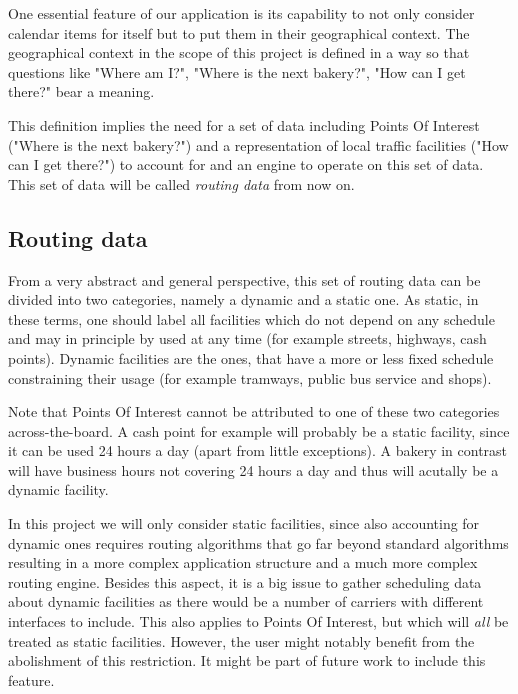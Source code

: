 One essential feature of our application is its capability to not only consider calendar items for itself but to put them in their geographical context. The geographical context in the scope of this project is defined in a way so that questions like "Where am I?", "Where is the next bakery?", "How can I get there?" bear a meaning.\newline

This definition implies the need for a set of data including Points Of Interest ("Where is the next bakery?") and a representation of  local traffic facilities ("How can I get there?") to account for and an engine to operate on this set of data. This set of data will be called \emph{routing data} from now on.

\subsection{Routing data}

From a very abstract and general perspective, this set of routing data can be divided into two categories, namely a dynamic and a static one. As static, in these terms, one should label all facilities which do not depend on any schedule and may in principle by used at any time (for example streets, highways, cash points). Dynamic facilities are the ones, that have a more or less fixed schedule constraining their usage (for example tramways, public bus service and shops).\newline

Note that Points Of Interest cannot be attributed to one of these two categories across-the-board. A cash point for example will probably be a static facility, since it can be used 24 hours a day (apart from little exceptions). A bakery in contrast will have business hours not covering 24 hours a day and thus will acutally be a dynamic facility.\newline

In this project we will only consider static facilities, since also accounting for dynamic ones requires routing algorithms that go far beyond standard algorithms resulting in a more complex application structure and a much more complex routing engine. Besides this aspect, it is a big issue to gather scheduling data about dynamic facilities as there would be a number of carriers with different interfaces to include. This also applies to Points Of Interest, but which will \emph{all} be treated as static facilities. However, the user might notably benefit from the abolishment of this restriction. It might be part of future work to include this feature.\newline

